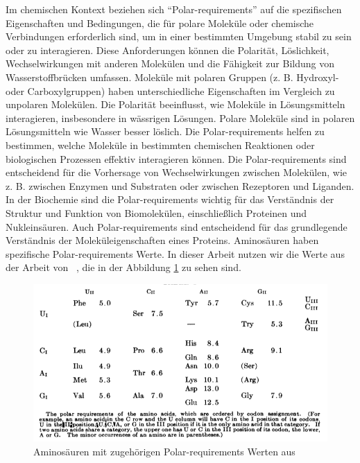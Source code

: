 \documentclass[german,version-2022-01]{uzl-thesis}
\begin{document}
Im chemischen Kontext beziehen sich "`Polar-requirements"' auf die spezifischen Eigenschaften und Bedingungen, die f\"ur polare Molek\"ule oder chemische Verbindungen erforderlich sind, um in einer bestimmten Umgebung stabil zu sein oder zu interagieren. Diese Anforderungen k\"onnen die Polarit\"at, L\"oslichkeit, Wechselwirkungen mit anderen Molek\"ulen und die F\"ahigkeit zur Bildung von Wasserstoffbr\"ucken umfassen. Molek\"ule mit polaren Gruppen (z. B. Hydroxyl- oder Carboxylgruppen) haben unterschiedliche Eigenschaften im Vergleich zu unpolaren Molek\"ulen. Die Polarit\"at beeinflusst, wie Molek\"ule in L\"osungsmitteln interagieren, insbesondere in w\"assrigen L\"osungen. Polare Molek\"ule sind in polaren L\"osungsmitteln wie Wasser besser l\"oslich. Die Polar-requirements helfen zu bestimmen, welche Molek\"ule in bestimmten chemischen Reaktionen oder biologischen Prozessen effektiv interagieren k\"onnen. Die Polar-requirements sind entscheidend f\"ur die Vorhersage von Wechselwirkungen zwischen Molek\"ulen, wie z. B. zwischen Enzymen und Substraten oder zwischen Rezeptoren und Liganden. In der Biochemie sind die Polar-requirements wichtig f\"ur das Verst\"andnis der Struktur und Funktion von Biomolek\"ulen, einschlie\ss{}lich Proteinen und Nukleins\"auren. Auch Polar-requirements sind entscheidend f\"ur das grundlegende Verst\"andnis der Molek\"uleigenschaften eines Proteins. 
Aminos\"auren haben spezifische Polar-requirements Werte. In dieser Arbeit nutzen wir die Werte aus der Arbeit  von \citeauthor{woese_fundamental_1966}~\cite{woese_fundamental_1966}, die in der Abbildung \ref{fig:Polar_requirements_indexe} zu sehen sind. 
\begin{figure}[tbp]
  \centering
  \includegraphics[scale=0.6]{Images/polar_requirements_scores_Paper.png}
  \caption{Aminos\"auren mit zugeh\"origen Polar-requirements Werten aus  \cite{woese_fundamental_1966}}
  \label{fig:Polar_requirements_indexe}
\end{figure}
\end{document}
